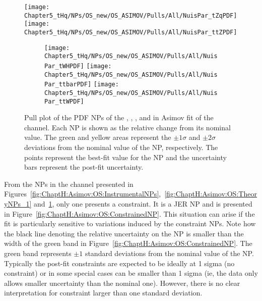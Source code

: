 \begin{figure}[h]
\centering
	\texttt{[image: Chapter5\_tHq/NPs/OS\_new/OS\_ASIMOV/Pulls/All/NuisPar\_tZqPDF]}
  	\texttt{[image: Chapter5\_tHq/NPs/OS\_new/OS\_ASIMOV/Pulls/All/NuisPar\_ttZPDF]}
	\begin{subfigure}{0.3\textwidth}
		\texttt{[image: Chapter5\_tHq/NPs/OS\_new/OS\_ASIMOV/Pulls/All/NuisPar\_tWHPDF]}
		\texttt{[image: Chapter5\_tHq/NPs/OS\_new/OS\_ASIMOV/Pulls/All/NuisPar\_ttbarPDF]}
		\texttt{[image: Chapter5\_tHq/NPs/OS\_new/OS\_ASIMOV/Pulls/All/NuisPar\_ttWPDF]}
	\end{subfigure}
\caption{Pull plot of the PDF NPs of the \tZq, \ttZ, \tWH, \ttW and \ttbar in Asimov fit of the \dilepOStau channel.
   Each NP is shown as the relative change from its nominal value.
   The green and yellow areas represent the $\pm1\sigma$ and $\pm2\sigma$ deviations from the nominal value of the NP, respectively. 
   The points represent the best-fit value for the NP and the uncertainty bars represent the post-fit uncertainty.} 
\label{fig:ChaptH:Asimov:OS:TheoryNPs_2}
\end{figure}

\FloatBarrier


From the NPs in the \dilepOStau channel presented in Figures~\ref{fig:ChaptH:Asimov:OS:InstrumentalNPs},~\ref{fig:ChaptH:Asimov:OS:TheoryNPs_1}
and~\ref{fig:ChaptH:Asimov:OS:TheoryNPs_2}, only one presents a constraint. 
It is a JER NP and is presented in Figure~\ref{fig:ChaptH:Asimov:OS:ConstrainedNP}. 
This situation can arise if the fit is particularly sensitive to variations induced by the constraint NPs.
Note how the black line denoting
the relative uncertainty on the NP is smaller than the width of the green band in Figure~\ref{fig:ChaptH:Asimov:OS:ConstrainedNP}.
The green band represents $\pm 1$ standard deviations from 
the nominal value of the NP. 
Typically the post-fit constraints are expected to be ideally at 1 sigma (no constraint) 
or in some special cases can be smaller than 1 sigma (ie, the data only allows smaller uncertainty
than the nominal one). However, there is no clear interpretation for constraint larger than one standard deviation. 


